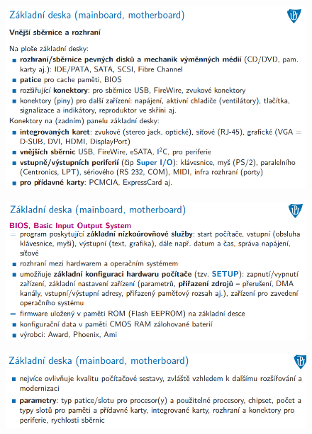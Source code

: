 \documentclass[10pt,a4paper]{article}
\begin{document}
\begin{figure} [h]
	\includegraphics[scale=0.65]{img/prvni_odstavec/otazka4/zakladni_deska10.png}	
\end{figure}

\begin{figure} [h]
	\includegraphics[scale=0.65]{img/prvni_odstavec/otazka4/zakladni_deska11.png}	
\end{figure}

\begin{figure} [h]
	\includegraphics[scale=0.65]{img/prvni_odstavec/otazka4/zakladni_deska12.png}	
\end{figure}


\clearpage
\end{document}

